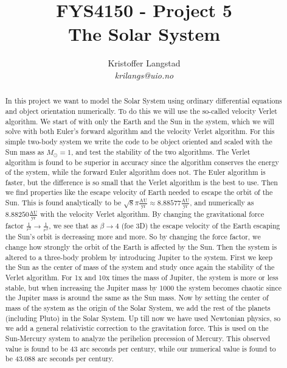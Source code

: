 \documentclass[12pt,a4paper,english]{article}
\title{FYS4150 - Project 5\\
The Solar System}
\date{}
\author{ Kristoffer Langstad\\ \textit{krilangs@uio.no}}
\begin{document}
\maketitle
\begin{abstract}
	In this project we want to model the Solar System using ordinary differential equations and object orientation numerically. To do this we will use the so-called velocity Verlet algorithm. We start of with only the Earth and the Sun in the system, which we will solve with both Euler's forward algorithm and the velocity Verlet algorithm. For this simple two-body system we write the code to be object oriented and scaled with the Sun mass as $M_\odot=1$, and test the stability of the two algorithms. The Verlet algorithm is found to be superior in accuracy since the algorithm conserves the energy of the system, while the forward Euler algorithm does not. The Euler algorithm is faster, but the difference is so small that the Verlet algorithm is the best to use. Then we find properties like the escape velocity of Earth needed to escape the orbit of the Sun. This is found analytically to be $\sqrt{8}\pi\frac{\text{AU}}{\text{yr}}\approx8.88577\frac{\text{AU}}{\text{yr}}$, and numerically as $8.88250\frac{\text{AU}}{\text{yr}}$ with the velocity Verlet algorithm. By changing the gravitational force factor $\frac{1}{r^3}\rightarrow\frac{1}{r^{\beta}}$, we see that as $\beta\rightarrow4$ (foe 3D) the escape velocity of the Earth escaping the Sun's orbit is decreasing more and more. So by changing the force factor, we change how strongly the orbit of the Earth is affected by the Sun. Then the system is altered to a three-body problem by introducing Jupiter to the system. First we keep the Sun as the center of mass of the system and study once again the stability of the Verlet algorithm. For 1x and 10x times the mass of Jupiter, the system is more or less stable, but when increasing the Jupiter mass by 1000 the system becomes chaotic since the Jupiter mass is around the same as the Sun mass. Now by setting the center of mass of the system as the origin of the Solar System, we add the rest of the planets (including Pluto) in the Solar System. Up till now we have used Newtonian physics, so we add a general relativistic correction to the gravitation force. This is used on the Sun-Mercury system to analyze the perihelion precession of Mercury. This observed value is found to be 43 arc seconds per century, while our numerical value is found to be 43.088 arc seconds per century.
\end{abstract}
\end{document}
